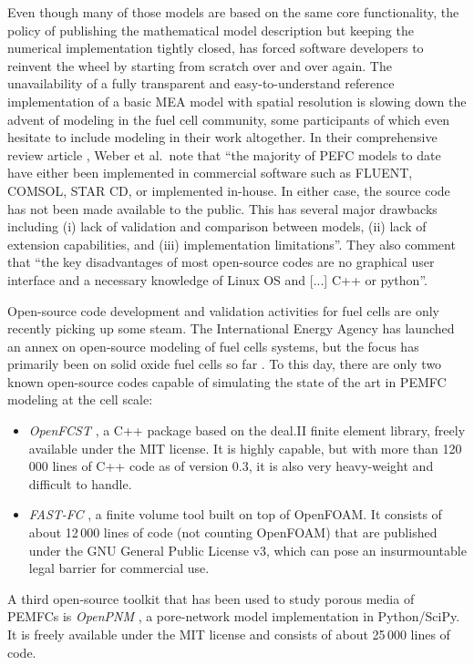 \documentclass[fontsize=9pt,DIV=calc,a4paper,twocolumn]{scrartcl}
\begin{document}
Even though many of those models are based on the same core functionality, the policy of publishing the mathematical model description but keeping the numerical implementation tightly closed, has forced software developers to reinvent the wheel by starting from scratch over and over again. The unavailability of a fully transparent and easy-to-understand reference implementation of a basic MEA model with spatial resolution is slowing down the advent of modeling in the fuel cell community, some participants of which even hesitate to include modeling in their work altogether. In their comprehensive review article \cite{weber:14}, Weber et al.\ note that ``the majority of PEFC models to date have either been implemented in commercial software such as FLUENT, COMSOL, STAR CD, or implemented in-house. In either case, the source code has not been made available to the public. This has several major drawbacks including (i) lack of validation and comparison between models, (ii) lack of extension capabilities, and (iii) implementation limitations''. They also comment that ``the key disadvantages of most open-source codes are no graphical user interface and a necessary knowledge of Linux OS and [...] C++ or python''.

Open-source code development and validation activities for fuel cells are only recently picking up some steam. The International Energy Agency has launched an annex on open-source modeling of fuel cells systems, but the focus has primarily been on solid oxide fuel cells so far \cite{le:15,beale:16}. To this day, there are only two known open-source codes capable of simulating the state of the art in PEMFC modeling at the cell scale:
\begin{itemize}
\item \textit{OpenFCST} \cite{secanell:14}, a C++ package based on the deal.II finite element library, freely available under the MIT license. It is highly capable, but with more than 120\,000 lines of C++ code as of version 0.3, it is also very heavy-weight and difficult to handle.
\item \textit{FAST-FC} \cite{fast-fc}, a finite volume tool built on top of OpenFOAM. It consists of about 12\,000 lines of code (not counting OpenFOAM) that are published under the GNU General Public License v3, which can pose an insurmountable legal barrier for commercial use.
\end{itemize}
A third open-source toolkit that has been used to study porous media of PEMFCs is \textit{OpenPNM} \cite{gostick:16}, a pore-network model implementation in Python/SciPy. It is freely available under the MIT license and consists of about 25\,000 lines of code.
\end{document}
